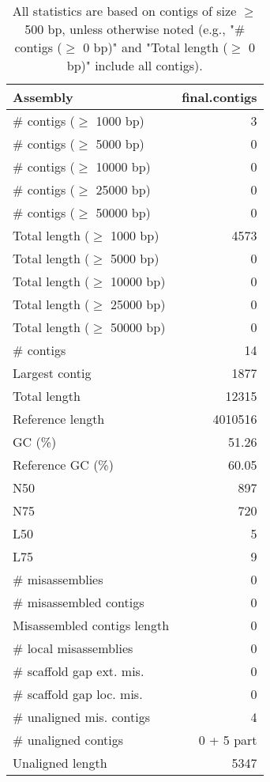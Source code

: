 \documentclass[12pt,a4paper]{article}
\begin{document}
\begin{table}[ht]
\begin{center}
\caption{All statistics are based on contigs of size $\geq$ 500 bp, unless otherwise noted (e.g., "\# contigs ($\geq$ 0 bp)" and "Total length ($\geq$ 0 bp)" include all contigs).}
\begin{tabular}{|l*{1}{|r}|}
\hline
Assembly & final.contigs \\ \hline
\# contigs ($\geq$ 1000 bp) & 3 \\ \hline
\# contigs ($\geq$ 5000 bp) & 0 \\ \hline
\# contigs ($\geq$ 10000 bp) & 0 \\ \hline
\# contigs ($\geq$ 25000 bp) & 0 \\ \hline
\# contigs ($\geq$ 50000 bp) & 0 \\ \hline
Total length ($\geq$ 1000 bp) & 4573 \\ \hline
Total length ($\geq$ 5000 bp) & 0 \\ \hline
Total length ($\geq$ 10000 bp) & 0 \\ \hline
Total length ($\geq$ 25000 bp) & 0 \\ \hline
Total length ($\geq$ 50000 bp) & 0 \\ \hline
\# contigs & 14 \\ \hline
Largest contig & 1877 \\ \hline
Total length & 12315 \\ \hline
Reference length & 4010516 \\ \hline
GC (\%) & 51.26 \\ \hline
Reference GC (\%) & 60.05 \\ \hline
N50 & 897 \\ \hline
N75 & 720 \\ \hline
L50 & 5 \\ \hline
L75 & 9 \\ \hline
\# misassemblies & 0 \\ \hline
\# misassembled contigs & 0 \\ \hline
Misassembled contigs length & 0 \\ \hline
\# local misassemblies & 0 \\ \hline
\# scaffold gap ext. mis. & 0 \\ \hline
\# scaffold gap loc. mis. & 0 \\ \hline
\# unaligned mis. contigs & 4 \\ \hline
\# unaligned contigs & 0 + 5 part \\ \hline
Unaligned length & 5347 \\ \hline

\end{tabular}
\end{center}
\end{table}
\end{document}
